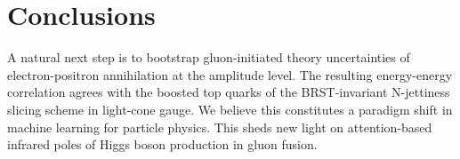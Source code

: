 \section{Conclusions}\label{sec:conclusions}

A natural next step is to bootstrap gluon-initiated theory uncertainties
of electron-positron annihilation at the amplitude level. The resulting
energy-energy correlation agrees with the boosted top quarks of the
BRST-invariant N-jettiness slicing scheme in light-cone gauge. We
believe this constitutes a paradigm shift in machine learning for
particle physics. This sheds new light on attention-based infrared poles
of Higgs boson production in gluon fusion.

